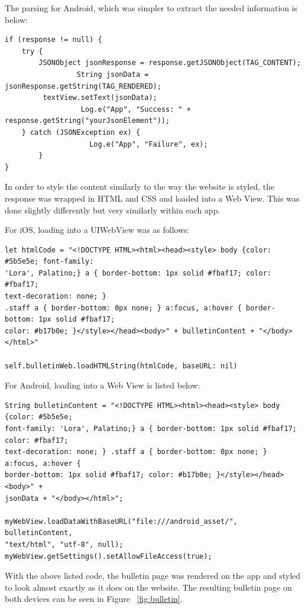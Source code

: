 \documentclass[letterpaper,10pt,draftclsnofoot,onecolumn,titlepage]{IEEEtran}
\begin{document}
		The parsing for Android, which was simpler to extract the needed information is below:

		\begin{lstlisting}
if (response != null) {
	try {
		JSONObject jsonResponse = response.getJSONObject(TAG_CONTENT);
                 String jsonData = jsonResponse.getString(TAG_RENDERED);
		 textView.setText(jsonData);
                  Log.e("App", "Success: " + response.getString("yourJsonElement"));
	} catch (JSONException ex) {
                    Log.e("App", "Failure", ex);
        }
}
	\end{lstlisting}


		In order to style the content similarly to the way the website is styled, the response was wrapped in HTML and CSS and loaded into a Web View.
		This was done slightly differently but very similarly within each app.

		For iOS, loading into a UIWebView was as follows:
		\begin{lstlisting}
let htmlCode = "<!DOCTYPE HTML><html><head><style> body {color: #5b5e5e; font-family:
'Lora', Palatino;} a { border-bottom: 1px solid #fbaf17; color: #fbaf17;
text-decoration: none; }
.staff a { border-bottom: 0px none; } a:focus, a:hover { border-bottom: 1px solid #fbaf17;
color: #b17b0e; }</style></head><body>" + bulletinContent + "</body></html>"

self.bulletinWeb.loadHTMLString(htmlCode, baseURL: nil)
		\end{lstlisting}

		For Android, loading into a Web View is listed below:
		\begin{lstlisting}
String bulletinContent = "<!DOCTYPE HTML><html><head><style> body {color: #5b5e5e;
font-family: 'Lora', Palatino;} a { border-bottom: 1px solid #fbaf17; color: #fbaf17;
text-decoration: none; } .staff a { border-bottom: 0px none; } a:focus, a:hover {
border-bottom: 1px solid #fbaf17; color: #b17b0e; }</style></head><body>" +
jsonData + "</body></html>";

myWebView.loadDataWithBaseURL("file:///android_asset/", bulletinContent,
"text/html", "utf-8", null);
myWebView.getSettings().setAllowFileAccess(true);
		\end{lstlisting}

		With the above listed code, the bulletin page was rendered on the app and styled to look almost exactly as it does on the website.
		The resulting bulletin page on both devices can be seen in Figure ~\ref{fig:bulletin}.
\end{document}
